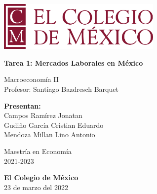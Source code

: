 \begin{titlepage}
   \begin{center}
       \vspace*{1cm}
      
        \includegraphics[width=0.6\textwidth]{COLMEX.png}
        
        \vspace*{1cm}

       \textbf{Tarea 1: Mercados Laborales en México}

       \vspace{0.5cm}
        Macroeconomía II \\
        \vspace{0.5cm}
        Profesor: Santiago Bazdresch Barquet
            
       \vspace{1.5cm}

       \textbf{Presentan:} \\
       \vspace{0.5cm}
        Campos Ramírez Jonatan\\ 
       Gudiño García Cristian Eduardo\\ 
       Mendoza Millan Lino Antonio 
       
       

       \vspace{3cm}
            
       Maestría en Economía\\
       2021-2023
            
       \vspace{0.8cm}
     
            
       \textbf{El Colegio de México}\\
        23 de marzo del 2022
            
   \end{center}
\end{titlepage}
